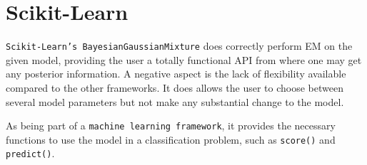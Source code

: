 \section*{Scikit-Learn}

\texttt{Scikit-Learn's BayesianGaussianMixture} does correctly perform EM on the given model, providing the user a totally functional API from where one may get any posterior information. A negative aspect is the lack of flexibility available compared to the other frameworks. It does allows the user to choose between several model parameters but not make any substantial change to the model.

As being part of a \texttt{machine learning framework}, it provides the necessary functions to use the model in a classification problem, such as \texttt{score()} and \texttt{predict()}.
